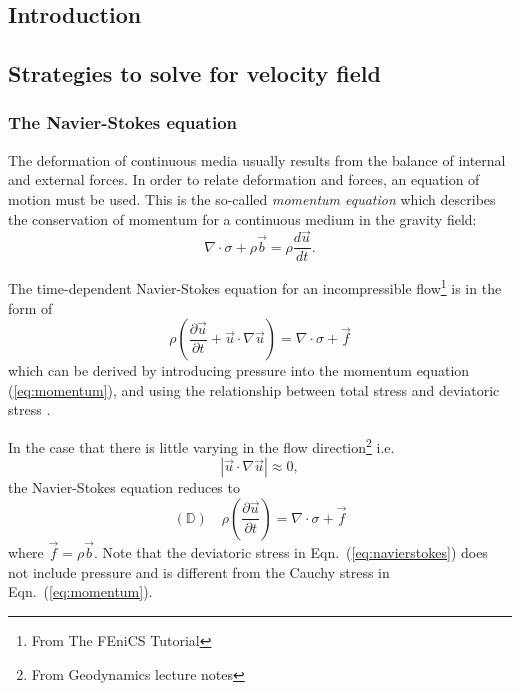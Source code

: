 \documentclass[11pt]{article}
\numberwithin{figure}{section}  %
\numberwithin{equation}{section}  %
\begin{document}
\begin{multicols}{2}

\section{Introduction}

\subsection{Strategies to solve for velocity field}

\subsubsection{The Navier-Stokes equation}

The deformation of continuous media usually results from the balance of internal and external forces. In order to relate deformation and forces, an equation of motion must be used. This is the so-called \emph{momentum equation} which describes the conservation of momentum for a continuous medium in the gravity field:
\begin{equation}\label{eq:momentum}
    \nabla\cdot\sigma + \rho\vec{b} = \rho\dfrac{d\vec{u}}{dt}.
\end{equation}

The time-dependent Navier-Stokes equation for an incompressible flow\footnote{From The FEniCS Tutorial} is in the form of
\begin{equation}
    \rho\left(\dfrac{\partial\vec{u}}{\partial{t}} + \vec{u}\cdot\nabla\vec{u}\right) = \nabla\cdot\sigma + \vec{f}
\end{equation}
which can be derived by introducing pressure into the momentum equation (\ref{eq:momentum}), and using the relationship between total stress and deviatoric stress \citep{gerya2009introduction}.

In the case that there is little varying in the flow direction\footnote{From Geodynamics lecture notes} i.e.
\begin{equation}
    |\vec{u}\cdot\nabla\vec{u}| \approx 0,
\end{equation}
the Navier-Stokes equation reduces to
\begin{equation}\label{eq:navierstokes}
    (\mathbb{D})\quad\rho\left(\dfrac{\partial\vec{u}}{\partial{t}}\right) = \nabla\cdot\sigma + \vec{f}
\end{equation}
where $\vec{f}=\rho\vec{b}$. Note that the deviatoric stress in Eqn.\ (\ref{eq:navierstokes}) does not include pressure and is different from the Cauchy stress in Eqn.\ (\ref{eq:momentum}).


\end{multicols}
\end{document}

